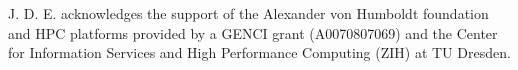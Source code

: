 \documentclass[journal=langd5,manuscript=article]{achemso}
\begin{document}
  




\begin{acknowledgement}
  J. D. E. acknowledges the support of the Alexander von Humboldt foundation and HPC platforms provided by a GENCI grant (A0070807069) and the Center for Information Services and High Performance Computing (ZIH) at TU Dresden.
\end{acknowledgement}





\end{document}
